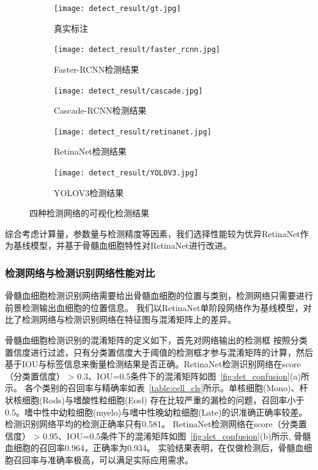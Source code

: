 \begin{figure}[htbp]
	\centering
	\begin{subfigure}{0.9\linewidth}
		\centering
		\texttt{[image: detect\_result/gt.jpg]}
    \caption{真实标注}
	\end{subfigure}
	\centering
	\begin{subfigure}{0.9\linewidth}
		\centering
		\texttt{[image: detect\_result/faster\_rcnn.jpg]}
    \caption{Faster-RCNN检测结果}
	\end{subfigure}
	\centering
	\begin{subfigure}{0.9\linewidth}
		\centering
		\texttt{[image: detect\_result/cascade.jpg]}
    \caption{Cascade-RCNN检测结果}
	\end{subfigure}
	\centering
	\begin{subfigure}{0.9\linewidth}
		\centering
		\texttt{[image: detect\_result/retinanet.jpg]}
    \caption{RetinaNet检测结果}
	\end{subfigure}
	\centering
  \begin{subfigure}{0.9\linewidth}
		\centering
		\texttt{[image: detect\_result/YOLOV3.jpg]}
    \caption{YOLOV3检测结果}
	\end{subfigure}
	\caption{四种检测网络的可视化检测结果}
	\label{fig:detect_result}
\end{figure}

综合考虑计算量，参数量与检测精度等因素，我们选择性能较为优异RetinaNet作为基线模型，并基于骨髓血细胞特性对RetinaNet进行改进。

\subsubsection{检测网络与检测识别网络性能对比}

骨髓血细胞检测识别网络需要给出骨髓血细胞的位置与类别，检测网络只需要进行前景检测输出血细胞的位置信息。
我们以RetinaNet单阶段网络作为基线模型，对比了检测网络与检测识别网络在特征图与混淆矩阵上的差异。

骨髓血细胞检测识别的混淆矩阵的定义如下，首先对网络输出的检测框
按照分类置信度进行过滤，只有分类置信度大于阈值的检测框才参与混淆矩阵的计算，然后
基于IOU与标签信息来衡量检测结果是否正确。RetinaNet检测识别网络在score（分类置信度） > 0.3、IOU=0.5条件下的混淆矩阵如图~\ref{fig:det_confusion}(a)所示。
各个类别的召回率与精确率如表~\ref{table:cell_cls}所示。单核细胞(Mono)、杆状核细胞(Rods)与嗜酸性粒细胞(Eosl)
存在比较严重的漏检的问题，召回率小于0.5。嗜中性中幼粒细胞(myelo)与嗜中性晚幼粒细胞(Late)的识准确正确率较差。
检测识别网络平均的检测正确率只有0.581。
RetinaNet检测网络在score（分类置信度） > 0.95、IOU=0.5条件下的混淆矩阵如图~\ref{fig:det_confusion}(b)所示, 骨髓血细胞的召回率0.964，正确率为0.934。
实验结果表明，在仅做检测后，骨髓血细胞召回率与准确率极高，可以满足实际应用需求。

